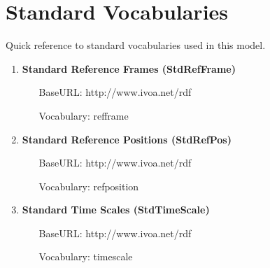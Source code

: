\pagebreak
\section{Standard Vocabularies}
Quick reference to standard vocabularies used in this model.

  \begin{enumerate}
    \item \textbf{Standard Reference Frames (StdRefFrame)}
    \begin{itemize}
      \item[BaseURL:] http://www.ivoa.net/rdf
      \item[Vocabulary:] refframe
    \end{itemize}
    \item \textbf{Standard Reference Positions (StdRefPos)}
    \begin{itemize}
      \item[BaseURL:]  http://www.ivoa.net/rdf
      \item[Vocabulary:] refposition
    \end{itemize}
    \item \textbf{Standard Time Scales (StdTimeScale)}
    \begin{itemize}
      \item[BaseURL:]  http://www.ivoa.net/rdf
      \item[Vocabulary:] timescale
    \end{itemize}
\end{enumerate}

